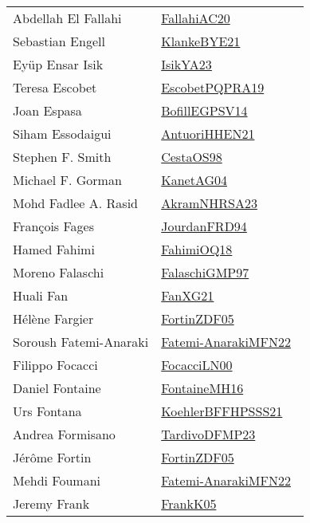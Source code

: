 {\begin{longtable}{p{4cm}p{20cm}}
Abdellah El Fallahi & \href{works/FallahiAC20.pdf}{FallahiAC20}~\cite{FallahiAC20}\\
Sebastian Engell & \href{works/KlankeBYE21.pdf}{KlankeBYE21}~\cite{KlankeBYE21}\\
Ey{\"{u}}p Ensar Isik & \href{works/IsikYA23.pdf}{IsikYA23}~\cite{IsikYA23}\\
Teresa Escobet & \href{works/EscobetPQPRA19.pdf}{EscobetPQPRA19}~\cite{EscobetPQPRA19}\\
Joan Espasa & \href{works/BofillEGPSV14.pdf}{BofillEGPSV14}~\cite{BofillEGPSV14}\\
Siham Essodaigui & \href{works/AntuoriHHEN21.pdf}{AntuoriHHEN21}~\cite{AntuoriHHEN21}\\
Stephen F. Smith & \href{works/CestaOS98.pdf}{CestaOS98}~\cite{CestaOS98}\\
Michael F. Gorman & \href{}{KanetAG04}~\cite{KanetAG04}\\
Mohd Fadlee A. Rasid & \href{works/AkramNHRSA23.pdf}{AkramNHRSA23}~\cite{AkramNHRSA23}\\
Fran{\c{c}}ois Fages & \href{}{JourdanFRD94}~\cite{JourdanFRD94}\\
Hamed Fahimi & \href{works/FahimiOQ18.pdf}{FahimiOQ18}~\cite{FahimiOQ18}\\
Moreno Falaschi & \href{works/FalaschiGMP97.pdf}{FalaschiGMP97}~\cite{FalaschiGMP97}\\
Huali Fan & \href{works/FanXG21.pdf}{FanXG21}~\cite{FanXG21}\\
H{\'{e}}l{\`{e}}ne Fargier & \href{works/FortinZDF05.pdf}{FortinZDF05}~\cite{FortinZDF05}\\
Soroush Fatemi-Anaraki & \href{}{Fatemi-AnarakiMFN22}~\cite{Fatemi-AnarakiMFN22}\\
Filippo Focacci & \href{works/FocacciLN00.pdf}{FocacciLN00}~\cite{FocacciLN00}\\
Daniel Fontaine & \href{works/FontaineMH16.pdf}{FontaineMH16}~\cite{FontaineMH16}\\
Urs Fontana & \href{works/KoehlerBFFHPSSS21.pdf}{KoehlerBFFHPSSS21}~\cite{KoehlerBFFHPSSS21}\\
Andrea Formisano & \href{works/TardivoDFMP23.pdf}{TardivoDFMP23}~\cite{TardivoDFMP23}\\
J{\'{e}}r{\^{o}}me Fortin & \href{works/FortinZDF05.pdf}{FortinZDF05}~\cite{FortinZDF05}\\
Mehdi Foumani & \href{}{Fatemi-AnarakiMFN22}~\cite{Fatemi-AnarakiMFN22}\\
Jeremy Frank & \href{works/FrankK05.pdf}{FrankK05}~\cite{FrankK05}\\

\end{longtable}}
